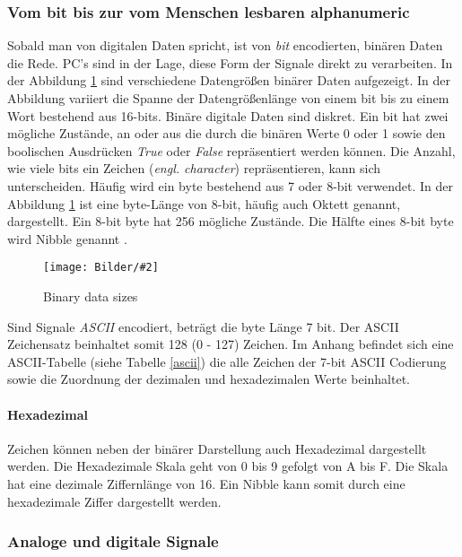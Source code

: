 \documentclass[
fontsize=12pt, 
paper=a4, 
BCOR=10mm, 
twoside=false,
 DIV=10, 
 headsepline, 
 footsepline
 ]{scrartcl}
\def\bild#1#2#3#4#5#6{%
\begin{figure}[h!] %
\centering
\texttt{[image: Bilder/\#2]}
\vspace{#3}
\caption[#4]{#5}\label{#6}
\end{figure}
}
\begin{document}
\subsubsection{Vom bit bis zur vom Menschen lesbaren alphanumeric}

Sobald man von digitalen Daten spricht, ist von \textit{bit} encodierten, binären Daten die Rede. PC's sind in der Lage, diese Form der Signale direkt zu verarbeiten. In der Abbildung \ref{binary_data_sizes} sind verschiedene Datengrößen binärer Daten aufgezeigt. In der Abbildung variiert die Spanne der Datengrößenlänge von einem bit bis zu einem Wort bestehend aus 16-bits. Binäre digitale Daten sind diskret. Ein bit hat zwei mögliche Zustände, an oder aus die durch die binären Werte 0 oder 1 sowie den boolischen Ausdrücken \textit{True} oder \textit{False} repräsentiert werden können. Die Anzahl, wie viele bits ein Zeichen (\textit{engl. character}) repräsentieren, kann sich unterscheiden. Häufig wird ein byte bestehend aus 7 oder 8-bit verwendet. In der Abbildung \ref{binary_data_sizes} ist eine byte-Länge von 8-bit, häufig auch Oktett genannt, dargestellt. Ein 8-bit byte hat 256 mögliche Zustände. Die Hälfte eines 8-bit byte wird Nibble genannt \cite[S. 3]{hughes2010real}.

\bild{0.8}
{binary_data_sizes.png}
{0em}
{Binary data sizes }
{Binary data sizes \cite[S. 3]{hughes2010real} }
{binary_data_sizes}

Sind Signale \textit{ASCII} encodiert, beträgt die byte Länge 7 bit. Der ASCII Zeichensatz beinhaltet somit 128 (0 - 127) Zeichen. Im Anhang befindet sich eine ASCII-Tabelle (siehe Tabelle \ref{ascii}) die alle Zeichen der 7-bit ASCII Codierung sowie die Zuordnung der dezimalen und hexadezimalen Werte beinhaltet. \\

\paragraph{Hexadezimal} Zeichen können neben der binärer Darstellung auch Hexadezimal dargestellt werden. Die Hexadezimale Skala geht von 0 bis 9 gefolgt von A bis F. Die Skala hat eine dezimale Ziffernlänge von 16. Ein Nibble kann somit durch eine hexadezimale Ziffer dargestellt werden.

\subsubsection{Analoge und digitale Signale}
\end{document}
